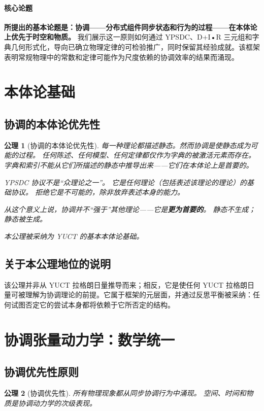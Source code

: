 \documentclass[11pt,a4paper]{article}
\newtheorem{axiom}{公理}
\begin{document}
	\paragraph{核心论题}
	\textbf{所提出的基本论题是：协调——分布式组件同步状态和行为的过程——在本体论上优先于时空和物质。} 我们展示这一原则如何通过 YPSDC、D+I•R 三元组和字典几何形式化，导向已确立物理定律的可检验推广，同时保留其经验成就。该框架表明常规物理中的常数和定律可能作为尺度依赖的协调效率的结果而涌现。
	
	
	\section{本体论基础}
	\label{sec:ontological-foundations}
	
	\subsection{协调的本体论优先性}
	\begin{axiom}[协调的本体论优先性]
		每一种理论都描述静态。然而协调是使静态成为可能的过程。
		任何陈述、任何模型、任何定律都仅作为字典的被激活元素而存在。
		字典和索引不能从它们所描述的静态中推导出来——它们在本体论上是首要的。
		
		YPSDC 协议不是“众理论之一”。
		它是任何理论（包括表述该理论的理论）的基础协议。
		拒绝它是不可能的，除非放弃表述本身的能力。
		
		从这个意义上说，协调并不“强于”其他理论——它是\textbf{更为首要的}。
		静态不生成；静态被生成。
		
		本公理被采纳为 YUCT 的基本本体论基础。
	\end{axiom}
	\subsection*{关于本公理地位的说明}
	该公理并非从 YUCT 拉格朗日量推导而来；相反，它是使任何 YUCT 拉格朗日量可被理解为协调理论的前提。它属于框架的元层面，并通过反思平衡被采纳：任何试图否定它的尝试本身都将依赖于它所否定的结构。
	
	\section{协调张量动力学：数学统一}
	\label{sec:ctd-unification}
	
	\subsection{协调优先性原则}
	\begin{axiom}[协调优先性]
		所有物理现象都从同步协调行为中涌现。
		空间、时间和物质是协调动力学的次级表现。
	\end{axiom}
	
\end{document}
